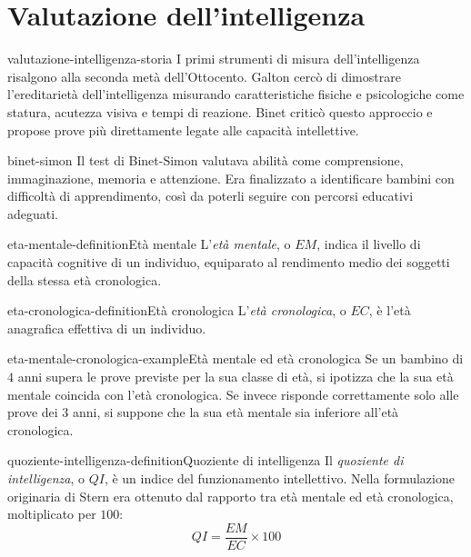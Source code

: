 \documentclass[preview]{standalone}
\begin{document}
\genpage

\section{Valutazione dell'intelligenza}

\begin{snippet}{valutazione-intelligenza-storia}
    I primi strumenti di misura dell'intelligenza risalgono alla seconda metà
    dell'Ottocento. Galton cercò di dimostrare l'ereditarietà dell'intelligenza
    misurando caratteristiche fisiche e psicologiche come statura, acutezza
    visiva e tempi di reazione. Binet criticò questo approccio e propose prove
    più direttamente legate alle capacità intellettive.
\end{snippet}

\begin{snippet}{binet-simon}
    Il test di Binet-Simon valutava abilità come comprensione, immaginazione,
    memoria e attenzione. Era finalizzato a identificare bambini con difficoltà
    di apprendimento, così da poterli seguire con percorsi educativi adeguati.
\end{snippet}

\begin{snippetdefinition}{eta-mentale-definition}{Età mentale}
    L'\emph{età mentale}, o \(EM\), indica il livello di capacità cognitive di
    un individuo, equiparato al rendimento medio dei soggetti della stessa età
    cronologica.
\end{snippetdefinition}

\begin{snippetdefinition}{eta-cronologica-definition}{Età cronologica}
    L'\emph{età cronologica}, o \(EC\), è l'età anagrafica effettiva di un
    individuo.
\end{snippetdefinition}

\begin{snippetexample}{eta-mentale-cronologica-example}{Età mentale ed età cronologica}
    Se un bambino di \(4\) anni supera le prove previste per la sua classe di
    età, si ipotizza che la sua età mentale coincida con l'età cronologica. Se
    invece risponde correttamente solo alle prove dei \(3\) anni, si suppone che
    la sua età mentale sia inferiore all'età cronologica.
\end{snippetexample}

\begin{snippetdefinition}{quoziente-intelligenza-definition}{Quoziente di intelligenza}
    Il \emph{quoziente di intelligenza}, o \(QI\), è un indice del funzionamento
    intellettivo. Nella formulazione originaria di Stern era ottenuto dal
    rapporto tra età mentale ed età cronologica, moltiplicato per \(100\):
    \[
        QI = \frac{EM}{EC} \times 100
    \]
\end{snippetdefinition}
\end{document}
